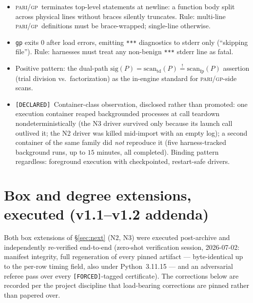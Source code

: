 \documentclass[11pt]{article}
\newcommand{\F}{\textnormal{\texttt{[FORCED]}}}
\newcommand{\Dc}{\textnormal{\texttt{[DECLARED]}}}
\newcommand{\gp}{\textsc{pari/gp}}
\theoremstyle{definition}
\begin{document}
\begin{itemize}
\item[\textbf{H1.}] \gp\ terminates top-level statements at newline: a function
body split across physical lines without braces silently truncates. Rule:
multi-line \gp\ definitions must be brace-wrapped; single-line otherwise.
\item[\textbf{H2.}] \texttt{gp} exits $0$ after load errors, emitting
\texttt{***} diagnostics to stderr only (``skipping file''). Rule: harnesses
must treat any non-benign \texttt{***} stderr line as fatal.
\item[\textbf{H3.}] Positive pattern: the dual-path
$\mathrm{sig}(P)=\mathrm{scan}_{\mathrm{td}}(P)\overset{!}{=}\mathrm{scan}_{\mathrm{fp}}(P)$
assertion (trial division vs.\ factorization) as the in-engine standard for
\gp-side scans.
\item[\textbf{H4.}] \Dc\ Container-class observation, disclosed rather than
promoted: one execution container reaped backgrounded processes at call
teardown nondeterministically (the N3 driver survived only because its launch
call outlived it; the N2 driver was killed mid-import with an empty log); a
second container of the same family did \emph{not} reproduce it (five
harness-tracked background runs, up to $15$ minutes, all completed). Binding
pattern regardless: foreground execution with checkpointed, restart-safe
drivers.
\end{itemize}

\section{Box and degree extensions, executed (v1.1--v1.2 addenda)}\label{sec:boxext}

Both box extensions of \S\ref{sec:next} (N2, N3) were executed post-archive
and independently re-verified end-to-end (zero-shot verification session,
2026-07-02: manifest integrity, full regeneration of every pinned artifact ---
byte-identical up to the per-row timing field, also under Python~3.11.15 ---
and an adversarial referee pass over every \F-tagged certificate). The corrections below are recorded per the
project discipline that load-bearing corrections are pinned rather than
papered over.
\end{document}

